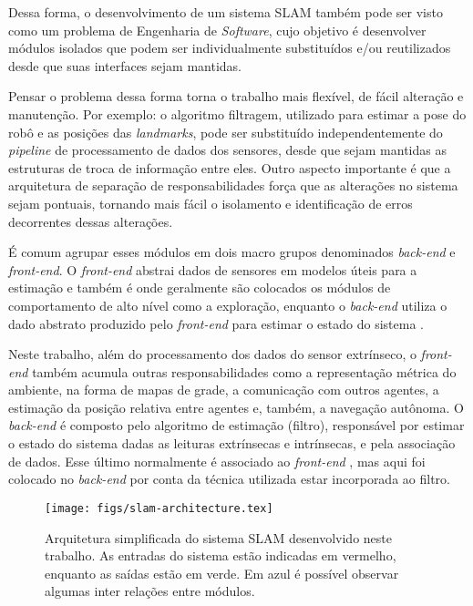 Dessa forma, o desenvolvimento de 
um sistema SLAM também pode ser visto como um problema de Engenharia de
\textit{Software}, cujo objetivo é desenvolver módulos isolados que podem 
ser individualmente substituídos e/ou reutilizados desde que suas interfaces 
sejam mantidas.

Pensar o problema dessa forma torna o trabalho mais flexível, de fácil alteração e manutenção. 
Por exemplo: o algoritmo filtragem, utilizado para estimar a pose do robô e as 
posições das \textit{landmarks}, pode ser substituído independentemente do 
\textit{pipeline} de processamento de dados dos sensores, desde que sejam 
mantidas as estruturas de troca de informação entre eles. 
Outro aspecto importante é que a arquitetura de separação de 
responsabilidades força que as alterações no sistema sejam pontuais, 
tornando mais fácil o isolamento e identificação de erros decorrentes 
dessas alterações.

É comum agrupar esses módulos em dois macro grupos denominados 
\textit{back-end} e \textit{front-end}. O \textit{front-end} abstrai dados de 
sensores em modelos úteis para a estimação e também é onde geralmente são colocados os módulos de comportamento de alto nível como a exploração, enquanto o \textit{back-end} utiliza 
o dado abstrato produzido pelo \textit{front-end} para estimar o estado do 
sistema \cite{cadena2016past}.

Neste trabalho, além do processamento dos dados do sensor extrínseco, o 
\textit{front-end} também acumula outras responsabilidades como a representação 
métrica do ambiente, na forma de mapas de grade, a comunicação com outros 
agentes, a estimação da posição relativa entre agentes e, também, a navegação 
autônoma. O \textit{back-end} é composto pelo algoritmo de estimação (filtro), 
responsável por estimar o estado do sistema dadas as leituras extrínsecas e intrínsecas, e pela associação de dados. Esse último normalmente é 
associado ao \textit{front-end} \cite[]{cadena2016past}, mas aqui foi 
colocado no \textit{back-end} por conta da técnica utilizada estar 
incorporada ao filtro.

\begin{figure}[h]
  \centering
  \texttt{[image: figs/slam-architecture.tex]}
  \caption{Arquitetura simplificada do sistema SLAM desenvolvido neste trabalho. As entradas do sistema estão indicadas em vermelho, enquanto as saídas estão em verde. Em azul é 
  possível observar algumas inter relações entre módulos.}
  \label{fig:slam-architecture}
\end{figure}

